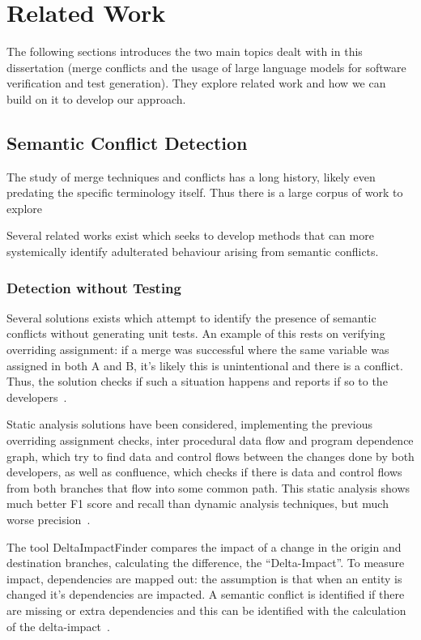 \chapter{Related Work} \label{chap:rw}

The following sections introduces the two main topics dealt with in this dissertation (merge conflicts and the usage of large language models for software verification and test generation). They explore related work and how we can build on it to develop our approach.

\section{Semantic Conflict Detection}

The study of merge techniques and conflicts has a long history, likely even predating the specific terminology itself. Thus there is a large corpus of work to explore

Several related works exist which seeks to develop methods that can more systemically identify adulterated behaviour arising from semantic conflicts.

\subsection{Detection without Testing}

Several solutions exists which attempt to identify the presence of semantic conflicts without generating unit tests. An example of this rests on verifying overriding assignment: if a merge was successful where the same variable was assigned in both A and B, it's likely this is unintentional and there is a conflict. Thus, the solution checks if such a situation happens and reports if so to the developers~\cite{kn:assigne}.


Static analysis solutions have been considered, implementing the previous overriding assignment checks, inter procedural data flow and program dependence graph, which try to find data and control flows between the changes done by both developers, as well as confluence, which checks if there is data and control flows from both branches that flow into some common path. This static analysis shows much better F1 score and recall than dynamic analysis techniques, but much worse precision~\cite{kn:staticanal}.


The tool DeltaImpactFinder compares the impact of a change in the origin and destination branches, calculating the difference, the ``Delta-Impact''. To measure impact, dependencies are mapped out: the assumption is that when an entity is changed it's dependencies are impacted. A semantic conflict is identified if there are missing or extra dependencies and this can be identified with the calculation of the delta-impact~\cite{kn:deltaimpact}.

